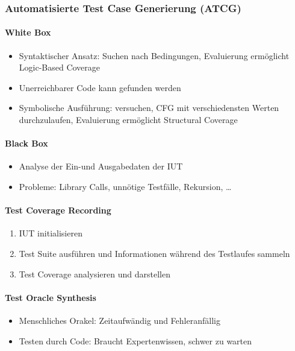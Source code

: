 \documentclass[
    ngerman,
    color=3b,
    summary,
    boxarc,
    main,
]{rubos-tuda-template}
\begin{document}
\subsubsection{Automatisierte Test Case Generierung (ATCG)}
\paragraph{White Box}\begin{itemize}
    \item Syntaktischer Ansatz: Suchen nach Bedingungen, Evaluierung ermöglicht Logic-Based Coverage
    \item Unerreichbarer Code kann gefunden werden
    \item Symbolische Ausführung: versuchen, CFG mit verschiedensten Werten durchzulaufen, Evaluierung ermöglicht Structural Coverage
\end{itemize}
\vspace*{-1ex}
\paragraph{Black Box}\begin{itemize}
    \item Analyse der Ein-und Ausgabedaten der IUT
    \item Probleme: Library Calls, unnötige Testfälle, Rekursion, \dots
\end{itemize}
\vspace*{-1ex}
\paragraph{Test Coverage Recording}\begin{enumerate}
    \item IUT initialisieren
    \item Test Suite ausführen und Informationen während des Testlaufes sammeln
    \item Test Coverage analysieren und darstellen
\end{enumerate}
\vspace*{-1ex}
\paragraph{Test Oracle Synthesis}\begin{itemize}
    \item Menschliches Orakel: Zeitaufwändig und Fehleranfällig
    \item Testen durch Code: Braucht Expertenwissen, schwer zu warten
\end{itemize}
\vspace*{-1ex}
\end{document}
